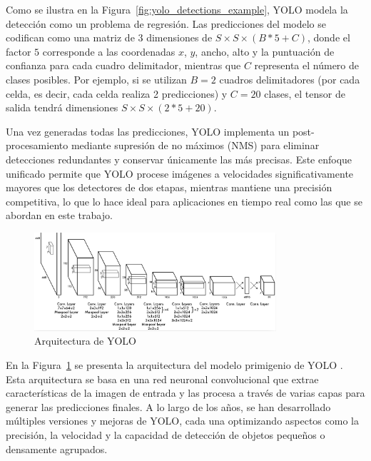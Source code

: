 \documentclass[11pt,spanish,listoffigures,listoftables]{tfgetsinf}
\begin{document}
Como se ilustra en la Figura~\ref{fig:yolo_detections_example}\cite{redmon2016lookonceunifiedrealtime}, YOLO modela la detección como un problema de regresión. Las predicciones del modelo se codifican como una matriz de 3 dimensiones de  $S \times S \times (B * 5 + C)$, donde el factor $5$ corresponde a las coordenadas $x$, $y$, ancho, alto y la puntuación de confianza para cada cuadro delimitador, mientras que $C$ representa el número de clases posibles. Por ejemplo, si se utilizan $B=2$ cuadros delimitadores (por cada celda, es decir, cada celda realiza 2 predicciones) y $C=20$ clases, el tensor de salida tendrá dimensiones $S \times S \times (2 * 5 + 20)$. 

Una vez generadas todas las predicciones, YOLO implementa un post-procesamiento mediante supresión de no máximos (NMS) para eliminar detecciones redundantes y conservar únicamente las más precisas. Este enfoque unificado permite que YOLO procese imágenes a velocidades significativamente mayores que los detectores de dos etapas, mientras mantiene una precisión competitiva, lo que lo hace ideal para aplicaciones en tiempo real como las que se abordan en este trabajo.

\begin{figure}[H]
   \centering
   \includegraphics[width=0.8\textwidth]{images/estado_del_arte/yolo_architecture.png}
   \caption{Arquitectura de YOLO}
   \label{fig:yolo_architecture}
\end{figure}

En la Figura~\ref{fig:yolo_architecture} se presenta la arquitectura del modelo primigenio de YOLO \cite{redmon2016lookonceunifiedrealtime}. Esta arquitectura se basa en una red neuronal convolucional que extrae características de la imagen de entrada y las procesa a través de varias capas para generar las predicciones finales. A lo largo de los años, se han desarrollado múltiples versiones y mejoras de YOLO, cada una optimizando aspectos como la precisión, la velocidad y la capacidad de detección de objetos pequeños o densamente agrupados.
\end{document}
